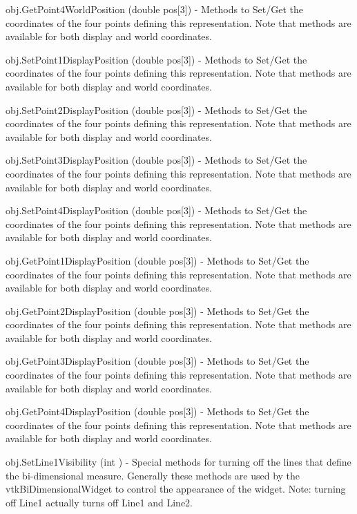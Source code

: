 \begin{DoxyItemize}
\item {\ttfamily obj.\-Get\-Point4\-World\-Position (double pos\mbox{[}3\mbox{]})} -\/ Methods to Set/\-Get the coordinates of the four points defining this representation. Note that methods are available for both display and world coordinates.  
\item {\ttfamily obj.\-Set\-Point1\-Display\-Position (double pos\mbox{[}3\mbox{]})} -\/ Methods to Set/\-Get the coordinates of the four points defining this representation. Note that methods are available for both display and world coordinates.  
\item {\ttfamily obj.\-Set\-Point2\-Display\-Position (double pos\mbox{[}3\mbox{]})} -\/ Methods to Set/\-Get the coordinates of the four points defining this representation. Note that methods are available for both display and world coordinates.  
\item {\ttfamily obj.\-Set\-Point3\-Display\-Position (double pos\mbox{[}3\mbox{]})} -\/ Methods to Set/\-Get the coordinates of the four points defining this representation. Note that methods are available for both display and world coordinates.  
\item {\ttfamily obj.\-Set\-Point4\-Display\-Position (double pos\mbox{[}3\mbox{]})} -\/ Methods to Set/\-Get the coordinates of the four points defining this representation. Note that methods are available for both display and world coordinates.  
\item {\ttfamily obj.\-Get\-Point1\-Display\-Position (double pos\mbox{[}3\mbox{]})} -\/ Methods to Set/\-Get the coordinates of the four points defining this representation. Note that methods are available for both display and world coordinates.  
\item {\ttfamily obj.\-Get\-Point2\-Display\-Position (double pos\mbox{[}3\mbox{]})} -\/ Methods to Set/\-Get the coordinates of the four points defining this representation. Note that methods are available for both display and world coordinates.  
\item {\ttfamily obj.\-Get\-Point3\-Display\-Position (double pos\mbox{[}3\mbox{]})} -\/ Methods to Set/\-Get the coordinates of the four points defining this representation. Note that methods are available for both display and world coordinates.  
\item {\ttfamily obj.\-Get\-Point4\-Display\-Position (double pos\mbox{[}3\mbox{]})} -\/ Methods to Set/\-Get the coordinates of the four points defining this representation. Note that methods are available for both display and world coordinates.  
\item {\ttfamily obj.\-Set\-Line1\-Visibility (int )} -\/ Special methods for turning off the lines that define the bi-\/dimensional measure. Generally these methods are used by the vtk\-Bi\-Dimensional\-Widget to control the appearance of the widget. Note\-: turning off Line1 actually turns off Line1 and Line2.  

\end{DoxyItemize}
